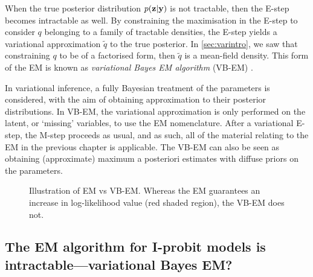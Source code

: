 When the true posterior distribution $p({\mathbf z}|{\mathbf y})$ is not tractable, then the E-step becomes intractable as well.
By constraining the maximisation in the E-step to consider $q$ belonging to a family of tractable densities, the E-step yields a variational approximation $\tilde q$ to the true posterior.
In \cref{sec:varintro}, we saw that constraining $q$ to be of a factorised form, then $\tilde q$ is a mean-field density.
This form of the EM is known as \emph{variational Bayes EM algorithm} (VB-EM) \citep{beal2003}.

In variational inference, a fully Bayesian treatment of the parameters is considered, with the aim of obtaining approximation to their posterior distributions.
In VB-EM, the variational approximation is only performed on the latent, or `missing' variables, to use the EM nomenclature.
After a variational E-step, the M-step proceeds as usual, and as such, all of the material relating to the EM in the previous chapter is applicable.
The VB-EM can also be seen as obtaining (approximate) maximum a posteriori estimates with diffuse priors on the parameters.

\begin{figure}[p]
  \centering
  \energyemEstep \hspace{0.5cm}
  \energyvbEstep
  \energyemMstep \hspace{0.5cm}
  \energyvbMstepa
  \energyemMstepfade \hspace{0.5cm}
  \energyvbMstepb
  \energyemMstepfade \hspace{0.5cm}
  \energyvbMstepc
  \vspace{-1em} 
  \caption{Illustration of EM vs VB-EM. Whereas the EM guarantees an increase in log-likelihood value (red shaded region), the VB-EM does not.}
\end{figure}



\subsection{The EM algorithm for I-probit models is intractable---variational Bayes EM?}
\label{sec:vbemiprobit}


